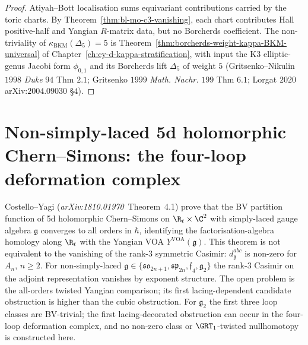 \begin{proof}
Atiyah--Bott localisation sums equivariant contributions carried by
the toric charts. By Theorem~\ref{thm:bl-mo-c3-vanishing}, each chart
contributes Hall positive-half and Yangian \(R\)-matrix data, but no
Borcherds coefficient. The non-triviality of
$\kappa_{\mathrm{BKM}}(\Delta_5) = 5$ is
Theorem~\ref{thm:borcherds-weight-kappa-BKM-universal} of
Chapter~\ref{ch:cy-d-kappa-stratification}, with
input the K3 elliptic-genus Jacobi form $\phi_{0, 1}$ and its
Borcherds lift $\Delta_5$ of weight $5$ (Gritsenko--Nikulin $1998$
\textit{Duke} $94$ Thm $2.1$; Gritsenko $1999$ \textit{Math. Nachr.}
$199$ Thm $6.1$; Lorgat $2020$ arXiv:$2004.09030$ \S $4$).
\end{proof}

\section{Non-simply-laced 5d holomorphic Chern--Simons: the four-loop
deformation complex}
\label{sec:thy-qg-non-simply-laced-hcs}

\providecommand{\GCtw}{\mathcal{GC}^{\mathrm{tw}}}
\providecommand{\GC}{\mathcal{GC}}
\providecommand{\gtwo}{\mathfrak{g}_2}
\providecommand{\fgg}{\mathfrak g}
\providecommand{\ffour}{\mathfrak{f}_4}
\providecommand{\son}{\mathfrak{so}_{2n+1}}
\providecommand{\spn}{\mathfrak{sp}_{2n}}
\providecommand{\Ytw}{Y^{\mathrm{tw}}}
\providecommand{\YVOA}{Y^{\mathrm{VOA}}}

Costello--Yagi (\textit{arXiv:1810.01970}~Theorem~4.1) prove that the BV
partition function of 5d holomorphic Chern--Simons on $\R_t \times \C^2$
with simply-laced gauge algebra $\fgg$ converges to all orders in
$\hbar$, identifying the factorisation-algebra homology along $\R_t$
with the Yangian VOA $\YVOA(\fgg)$. This theorem is not equivalent to
the vanishing of the rank-$3$ symmetric Casimir: $d^{abc}_\fgg$ is
non-zero for $A_n$, $n\geq2$. For non-simply-laced
$\fgg \in \{\son, \spn, \ffour, \gtwo\}$ the rank-$3$ Casimir on the
adjoint representation vanishes by exponent structure. The open
problem is the all-orders twisted Yangian comparison; its first
lacing-dependent candidate obstruction is higher than the cubic obstruction.
For $\gtwo$ the first three loop classes are BV-trivial; the first
lacing-decorated obstruction can occur in the four-loop deformation
complex, and no non-zero class or $\GRT_1$-twisted nullhomotopy is
constructed here.

